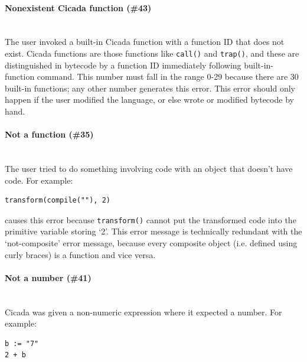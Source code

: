 \documentclass{article}
\newenvironment{code}{
       \begin{list}{}{
               \setlength{\leftmargin}{.4in}
               \setlength{\rightmargin}{0in}
               \setlength{\topsep}{.2in}
       }
       \small
       \item[] }
       { \end{list}   }
\begin{document}
\paragraph{Nonexistent Cicada function (\#43)\\\\}

The user invoked a built-in Cicada function with a function ID that does not exist.  Cicada functions are those functions like \verb#call()# and \verb#trap()#, and these are distinguished in bytecode by a function ID immediately following built-in-function command.  This number must fall in the range 0-29 because there are 30 built-in functions; any other number generates this error.  This error should only happen if the user modified the language, or else wrote or modified bytecode by hand.\\




\paragraph{Not a function (\#35)\\\\}

The user tried to do something involving code with an object that doesn't have code.  For example:

\begin{code} \begin{verbatim}
transform(compile(""), 2)
\end{verbatim} \end{code}

\noindent causes this error because \verb#transform()# cannot put the transformed code into the primitive variable storing `2'.  This error message is technically redundant with the `not-composite' error message, because every composite object (i.e. defined using curly braces) is a function and vice versa.\\




\paragraph{Not a number (\#41)\\\\}

Cicada was given a non-numeric expression where it expected a number.  For example:

\begin{code} \begin{verbatim}
b := "7"
2 + b
\end{verbatim} \end{code}
\end{document}
